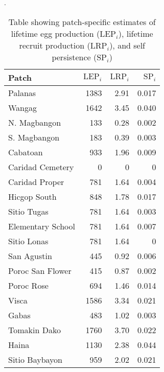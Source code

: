 \documentclass[12pt, oneside]{article}   	%
\begin{document}
\begin{table}[!htbp]
\caption{Table showing patch-specific estimates of lifetime egg production ($\text{LEP}_i$), lifetime recruit production ($\text{LRP}_i$), and self persistence ($\text{SP}_i$)}. \label{APP_TAB_PatchSpecificLEPandLRP}
\begin{centering}
\begin{tabular}{|l|r|r|r|}
\hline 
Patch & $\text{LEP}_i$ & $\text{LRP}_i$ & $\text{SP}_i$ \\ \hline
Palanas & 1383 & 2.91 & 0.017 \\ \hline  
Wangag & 1642 & 3.45 & 0.040 \\ \hline  
N. Magbangon & 133 & 0.28 & 0.002 \\ \hline
S. Magbangon & 183 & 0.39 & 0.003 \\ \hline
Cabatoan & 933 & 1.96 & 0.009 \\ \hline
Caridad Cemetery & 0 & 0 & 0 \\ \hline
Caridad Proper & 781 & 1.64 & 0.004 \\ \hline 
Hicgop South & 848 & 1.78 & 0.017 \\ \hline
Sitio Tugas & 781 & 1.64 & 0.003 \\ \hline  
Elementary School & 781 & 1.64 & 0.007 \\ \hline  
Sitio Lonas & 781 & 1.64 & 0 \\ \hline  
San Agustin & 445 & 0.92 & 0.006 \\ \hline  
Poroc San Flower & 415 & 0.87 & 0.002 \\ \hline
Poroc Rose & 694 & 1.46 & 0.014 \\ \hline
Visca & 1586 & 3.34 & 0.021 \\ \hline
Gabas & 483 & 1.02 & 0.003 \\ \hline
Tomakin Dako & 1760 & 3.70 & 0.022 \\ \hline  
Haina & 1130 & 2.38 & 0.044 \\ \hline
Sitio Baybayon & 959 & 2.02 & 0.021\\ \hline  
\end{tabular}
\end{centering}
\end{table}

\end{document}
